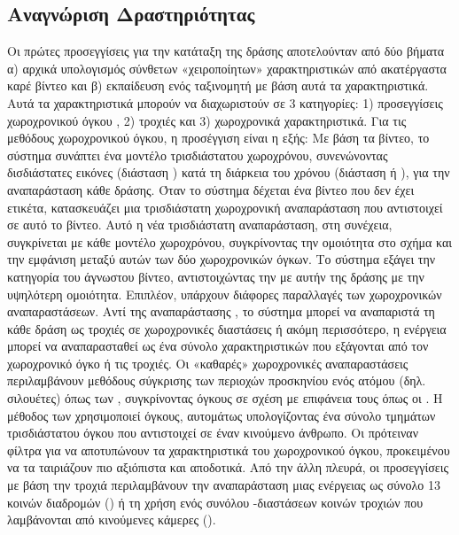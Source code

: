 \subsection{Αναγνώριση Δραστηριότητας}
Οι πρώτες προσεγγίσεις για την κατάταξη της δράσης αποτελούνταν από δύο βήματα α) αρχικά υπολογισμός σύνθετων «χειροποίητων» χαρακτηριστικών από ακατέργαστα καρέ βίντεο
και β) εκπαίδευση ενός ταξινομητή με βάση αυτά τα χαρακτηριστικά. Αυτά τα χαρακτηριστικά μπορούν να διαχωριστούν σε 3 κατηγορίες:
1) προσεγγίσεις χωροχρονικού όγκου , 2) τροχιές  και 3) χωροχρονικά  χαρακτηριστικά. Για τις μεθόδους χωροχρονικού όγκου,
η προσέγγιση είναι η εξής: Με βάση τα  βίντεο, το σύστημα συνάπτει ένα μοντέλο τρισδιάστατου χωροχρόνου, συνενώνοντας δισδιάστατες εικόνες
(διάσταση ) κατά τη διάρκεια του χρόνου (διάσταση  ή ), για την αναπαράσταση κάθε δράσης.
Όταν το σύστημα δέχεται ένα βίντεο που δεν έχει ετικέτα, κατασκευάζει μια τρισδιάστατη χωροχρονική αναπαράσταση που αντιστοιχεί σε αυτό το βίντεο.
Αυτό η νέα τρισδιάστατη αναπαράσταση, στη συνέχεια, συγκρίνεται με κάθε μοντέλο  χωροχρόνου, συγκρίνοντας την ομοιότητα στο σχήμα
και την εμφάνιση μεταξύ αυτών των δύο χωροχρονικών όγκων.
Το σύστημα εξάγει την κατηγορία του άγνωστου βίντεο, αντιστοιχώντας την με αυτήν της δράσης με την υψηλότερη ομοιότητα. Επιπλέον, υπάρχουν
διάφορες παραλλαγές των  χωροχρονικών αναπαραστάσεων. Αντί της αναπαράστασης , το σύστημα μπορεί να αναπαριστά τη κάθε δράση ως τροχιές
σε χωροχρονικές διαστάσεις ή ακόμη περισσότερο, η ενέργεια μπορεί να αναπαρασταθεί ως ένα σύνολο χαρακτηριστικών που εξάγονται από τον χωροχρονικό όγκο ή τις τροχιές.
Οι «καθαρές» χωροχρονικές αναπαραστάσεις περιλαμβάνουν μεθόδους σύγκρισης των περιοχών προσκηνίου ενός ατόμου (δηλ. σιλουέτες) όπως των \en \cite{BobickAaron}, \gr
συγκρίνοντας όγκους σε σχέση με επιφάνεια τους όπως οι \en \cite{1467296}\gr. Η μέθοδος των \en \cite{4270510} \gr χρησιμοποιεί  όγκους, αυτομάτως
υπολογίζοντας ένα σύνολο τμημάτων τρισδιάστατου όγκου  που αντιστοιχεί σε έναν κινούμενο άνθρωπο. Οι \en\cite{4587727} \gr πρότειναν φίλτρα για
να αποτυπώνουν τα χαρακτηριστικά του χωροχρονικού όγκου, προκειμένου να τα ταιριάζουν πιο αξιόπιστα και αποδοτικά.
Από την άλλη πλευρά, οι προσεγγίσεις με βάση την τροχιά περιλαμβάνουν την αναπαράσταση μιας ενέργειας ως σύνολο 13 κοινών διαδρομών (\en\cite{1541250}\gr) ή
τη χρήση ενός συνόλου -διαστάσεων κοινών τροχιών που λαμβάνονται από κινούμενες κάμερες  (\en\cite{1541251}\gr).
